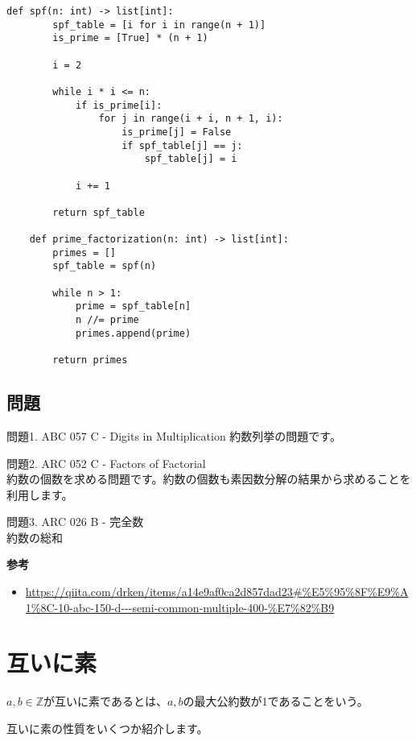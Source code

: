\documentclass{jlreq}
\begin{document}
\begin{lstlisting}[caption=SPFを用いた素因数分解の実装, label=spf, frame=TRBL]
def spf(n: int) -> list[int]:
        spf_table = [i for i in range(n + 1)]
        is_prime = [True] * (n + 1)
        
        i = 2
        
        while i * i <= n:
            if is_prime[i]:
                for j in range(i + i, n + 1, i):
                    is_prime[j] = False
                    if spf_table[j] == j:
                        spf_table[j] = i
            
            i += 1
            
        return spf_table 
    
    def prime_factorization(n: int) -> list[int]:
        primes = []
        spf_table = spf(n)
        
        while n > 1:
            prime = spf_table[n]
            n //= prime
            primes.append(prime)
        
        return primes
\end{lstlisting}

\subsection{問題}
問題1. ABC 057 C - Digits in Multiplication
約数列挙の問題です。

問題2. ARC 052 C - Factors of Factorial \\
約数の個数を求める問題です。約数の個数も素因数分解の結果から求めることを利用します。

問題3. ARC 026 B - 完全数\\
約数の総和

\textbf{参考}
\begin{itemize}
    \item \url{https://qiita.com/drken/items/a14e9af0ca2d857dad23#%E5%95%8F%E9%A1%8C-10-abc-150-d---semi-common-multiple-400-%E7%82%B9}
\end{itemize}
\section{互いに素}

\begin{definitionbox}[互いに素]
    $a, b \in \mathbb{Z}$が互いに素であるとは、$a, b$の最大公約数が1であることをいう。
\end{definitionbox}

互いに素の性質をいくつか紹介します。
\end{document}
